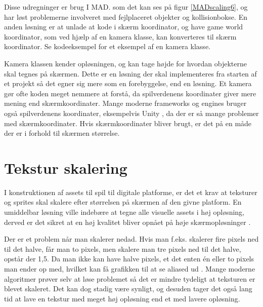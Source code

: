 \documentclass[Main.tex]{PositionOgSkalering}
\begin{document}
Disse udregninger er brug I MAD. som det kan ses på figur \ref{MADscaling6}, og har løst problemerne involveret med fejlplaceret objekter og kollisionbokse.
En anden løsning er at unlade at kode i skærm koordinator, og have game world koordinator, som ved hjælp af en kamera klasse, kan konverteres til skærm koordinator. Se kodeeksempel for et eksempel af en kamera klasse.

Kamera klassen kender opløsningen, og kan tage højde for hvordan objekterne skal tegnes på skærmen. Dette er en løsning der skal implementeres fra starten af et projekt så det egner sig mere som en forebyggelse, end en løsning. Et kamera gør ofte koden meget nemmere at forstå, da spilverdenens koordinater giver mere mening end skærmkoordinater. 
Mange moderne frameworks og engines bruger også spilverdenens koordinater, eksempelvis Unity \cite{unity3d}, da der er så mange problemer med skærmkoordinater. Hvis skærmkoordinater bliver brugt, er det på en måde der er i forhold til skærmen størrelse.

\begin{figure}[ht]
\lstset{numbers=left, language=[Sharp]C}

\end{figure}


\section{Tekstur skalering}

I konstruktionen af assets til spil til digitale platforme, er det et krav at teksturer og sprites skal skalere efter størrelsen på skærmen af den givne platform. En umiddelbar løsning ville indebære at tegne alle visuelle assets i høj opløsning, derved er det sikret at en høj kvalitet bliver opnået på høje skærmopløsninger \cite{deepworldgame}.

Der er et problem når man skalerer nedad. Hvis man f.eks. skalerer fire pixels ned til det halve, får man to pixels, men skalere man tre pixels ned til det halve, opstår der 1,5. Da man ikke kan have halve pixels, et det enten én eller to pixels man ender op med, hvilket kan få grafikken til at se aliased ud \cite{Martin}. Mange moderne algoritmer prøver selv at løse problemet så det er mindre tydeligt at teksturen er blevet skaleret.\cite{Kopf} Det kan dog stadig være synligt, og desuden tager det også lang tid at lave en tekstur med meget høj opløsning end et med lavere opløsning.
\end{document}
